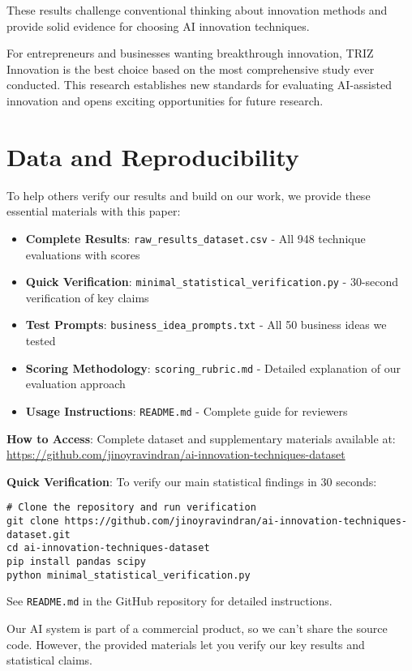 \documentclass[12pt]{article}
\begin{document}
These results challenge conventional thinking about innovation methods and provide solid evidence for choosing AI innovation techniques.

For entrepreneurs and businesses wanting breakthrough innovation, TRIZ Innovation is the best choice based on the most comprehensive study ever conducted. This research establishes new standards for evaluating AI-assisted innovation and opens exciting opportunities for future research.

\section*{Data and Reproducibility}

To help others verify our results and build on our work, we provide these essential materials with this paper:

\begin{itemize}
\item \textbf{Complete Results}: \texttt{raw\_results\_dataset.csv} - All 948 technique evaluations with scores
\item \textbf{Quick Verification}: \texttt{minimal\_statistical\_verification.py} - 30-second verification of key claims
\item \textbf{Test Prompts}: \texttt{business\_idea\_prompts.txt} - All 50 business ideas we tested
\item \textbf{Scoring Methodology}: \texttt{scoring\_rubric.md} - Detailed explanation of our evaluation approach
\item \textbf{Usage Instructions}: \texttt{README.md} - Complete guide for reviewers
\end{itemize}

\textbf{How to Access}: Complete dataset and supplementary materials available at: \url{https://github.com/jinoyravindran/ai-innovation-techniques-dataset}

\textbf{Quick Verification}: To verify our main statistical findings in 30 seconds:
\begin{verbatim}
# Clone the repository and run verification
git clone https://github.com/jinoyravindran/ai-innovation-techniques-dataset.git
cd ai-innovation-techniques-dataset
pip install pandas scipy
python minimal_statistical_verification.py
\end{verbatim}

See \texttt{README.md} in the GitHub repository for detailed instructions.

Our AI system is part of a commercial product, so we can't share the source code. However, the provided materials let you verify our key results and statistical claims.
\end{document}
